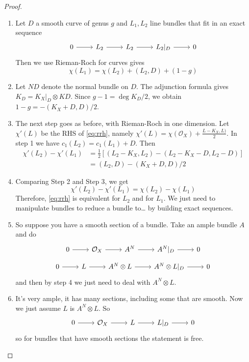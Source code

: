 \begin{proof}\leavevmode 
	
	\begin{enumerate}[label=\textbf{Step \arabic*}]
		\item Let $D$ a smooth curve of genus $g$ and $L_1,L_2$ line bundles that fit in an exact sequence
			\[\begin{tikzcd}
				0\arrow[r]&L_2\arrow[r]&L_2\arrow[r]&L_2|_{D}\arrow[r]&0
			\end{tikzcd}\]
Then we use Rieman-Roch for curves gives
\[\chi(L_1)=\chi(L_2)+(L_2,D)+(1-g)\]

\item Let $N D$ denote the normal bundle on $D$. The adjunction formula gives $K_D=K_X|_{D}\otimes KD$. Since $g-1=\operatorname{deg}K_D/2$, we obtain $1-g=-(K_X+D,D)/2$.

\item The next step goes as before, with  Rieman-Roch in one dimension. Let $\chi'(L)$ be the RHS of \cref{eq:rrh}, namely  $\chi'(L)=\chi(\mathcal{O}_{X})+\frac{L-K_X,L)}{2}$. In step 1 we have $c_1(L_2)=c_1(L_1)+D$. Then
	\begin{align*}
		\chi'(L_2)-\chi'(L_1)&=\frac{1}{2}\left[ (L_2-K_X,L_2)-(L_2-K_X-D,L_2-D) \right] \\
		&=(L_2,D)-(K_X+D,D)/2
	\end{align*}

	\item Comparing Step 2 and Step 3, we get
		\[\chi'(L_2)-\chi'(L_1)=\chi(L_2)-\chi(L_1)\]
		Therefore, \cref{eq:rrh} is equivalent for $L_2$ and for  $L_1$. We just need to manipulate bundles to reduce a bundle to… by building exact sequences.

	\item So suppose you have a smooth section of a bundle. Take an ample bundle $A$ and do
		\[\begin{tikzcd}
			0\arrow[r]&\mathcal{O}_X\arrow[r]&A^N\arrow[r]&A^N|_{D}\arrow[r]&0
		\end{tikzcd}\]
		\[\begin{tikzcd}
			0\arrow[r]&L\arrow[r]&A^N\otimes L\arrow[r]&A^N\otimes L|_{D}\arrow[r]&0
		\end{tikzcd}\]
	and then by step 4 we just need to deal with $A^N\otimes L$.

	\item It's very ample, it has many sections, including some that are smooth. Now we just assume $L$ is $A^N\otimes L$. So
		\[\begin{tikzcd}
			0\arrow[r]&\mathcal{O}_X\arrow[r]&L\arrow[r]&L|_{D}\arrow[r]&0
		\end{tikzcd}\]
		so for bundles that have smooth sections the statement is free.
	\end{enumerate}
\end{proof}

